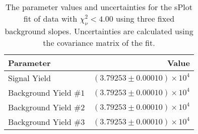 
\begin{table}[ht]
    \begin{center}
        \begin{tabular}{lr}\toprule
            Parameter & Value \\\midrule
            Signal Yield & $(3.79253 \pm 0.00010) \times 10^{4}$ \\
            Background Yield $\#1$ & $(3.79253 \pm 0.00010) \times 10^{4}$ \\
            Background Yield $\#2$ & $(3.79253 \pm 0.00010) \times 10^{4}$ \\
            Background Yield $\#3$ & $(3.79253 \pm 0.00010) \times 10^{4}$ \\\bottomrule
        \end{tabular}
        \caption{The parameter values and uncertainties for the sPlot fit of data with $\chi^2_\nu < 4.00$ using three fixed background slopes. Uncertainties are calculated using the covariance matrix of the fit.}\label{tab:splot-fit-results-chisqdof-4.00-fixed-3}
    \end{center}
\end{table}
